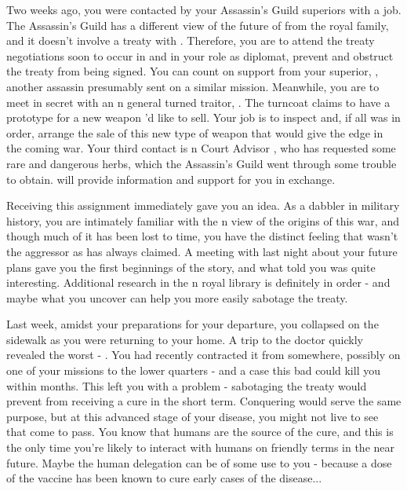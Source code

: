 \documentclass[char]{NeptuneBall}
\begin{document}
Two weeks ago, you were contacted by your Assassin's Guild superiors with a job. The Assassin's Guild has a different view of the future of \pPacifica{} from the royal family, and it doesn't involve a treaty with \pAtlantis{}. Therefore, you are to attend the treaty negotiations soon to occur in \pAtlantis{} and in your role as diplomat, prevent and obstruct the treaty from being signed. You can count on support from your superior, \cDiplomat{}, another assassin presumably sent on a similar mission. Meanwhile, you are to meet in secret with an \pAtlantis{}n general turned traitor, \cGeneral{}. The turncoat claims to have a prototype for a new weapon \cGeneral{\they}'d like to sell. Your job is to inspect and, if all was in order, arrange the sale of this new type of weapon that would give \pPacifica{} the edge in the coming war. Your third contact is \pAtlantis{}n Court Advisor \cManta{}, who has requested some rare and dangerous herbs, which the Assassin's Guild went through some trouble to obtain. \cManta{\They} will provide information and support for you in exchange. 

Receiving this assignment immediately gave you an idea. As a dabbler in military history, you are intimately familiar with the \pPacifica{}n view of the origins of this war, and though much of it has been lost to time, you have the distinct feeling that \pPacifica{} wasn't the aggressor as \pAtlantis{} has always claimed. A meeting with \cManta{} last night about your future plans gave you the first beginnings of the story, and what \cManta{\they} told you was quite interesting. Additional research in the \pAtlantis{}n royal library is definitely in order - and maybe what you uncover can help you more easily sabotage the treaty. 

Last week, amidst your preparations for your departure, you collapsed on the sidewalk as you were returning to your home. A trip to the doctor quickly revealed the worst - \pPolio{}. You had recently contracted it from somewhere, possibly on one of your missions to the lower quarters - and a case this bad could kill you within months. This left you with a problem - sabotaging the treaty would prevent \pPacifica{} from receiving a cure in the short term. Conquering \pAtlantis{} would serve the same purpose, but at this advanced stage of your disease, you might not live to see that come to pass. You know that humans are the source of the cure, and this is the only time you're likely to interact with humans on friendly terms in the near future. Maybe the human delegation can be of some use to you - because a dose of the vaccine has been known to cure early cases of the disease...
\end{document}
